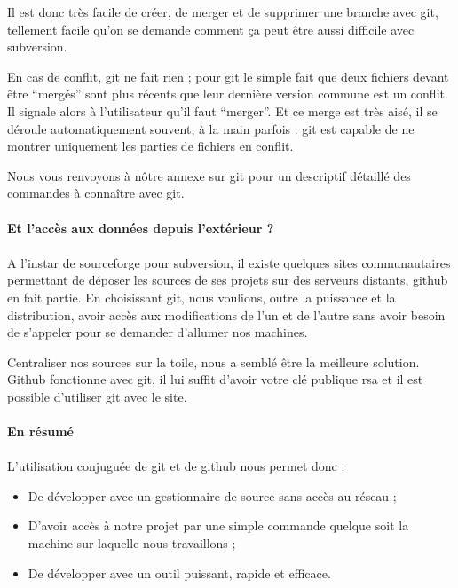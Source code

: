 Il est donc très facile de créer, de merger et de supprimer une branche avec git, tellement facile qu'on se demande comment ça peut être aussi difficile avec subversion.

En cas de conflit, git ne fait rien ; pour git le simple fait que deux fichiers devant être ``mergés'' sont plus récents que leur dernière version commune est un conflit. Il signale alors à l'utilisateur qu'il faut ``merger''. Et ce merge est très aisé, il se déroule automatiquement souvent, à la main parfois : git est capable de ne montrer uniquement les parties de fichiers en conflit.

Nous vous renvoyons à nôtre annexe sur git pour un descriptif détaillé des commandes à connaître avec git.


\paragraph{Et l'accès aux données depuis l'extérieur ?}
\paragraph{} A l'instar de sourceforge pour subversion, il existe quelques sites communautaires permettant de déposer les sources de ses projets sur des serveurs distants, github en fait partie. En choisissant git, nous voulions, outre la puissance et la distribution, avoir accès aux modifications de l'un et de l'autre sans avoir besoin de s'appeler pour se demander d'allumer nos machines.

Centraliser nos sources sur la toile, nous a semblé être la meilleure solution. Github fonctionne avec git, il lui suffit d'avoir votre clé publique rsa et il est possible d'utiliser git avec le site. 

\paragraph{En résumé}

\paragraph{}L'utilisation conjuguée de git et de github nous permet donc :
\begin{itemize}
 \item De développer avec un gestionnaire de source sans accès au réseau ;
 \item D'avoir accès à notre projet par une simple commande quelque soit la machine sur laquelle nous travaillons ;
\item De développer avec un outil puissant, rapide et efficace.
\end{itemize}

